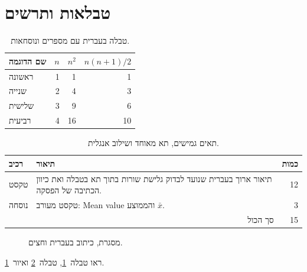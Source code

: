 \documentclass[11pt,a4paper]{article}
\begin{document}
\section{טבלאות ותרשים}\label{sec:tables}
\begin{table}[htbp]
\centering
\begin{tabular}{lrrr}
\toprule
שם הדוגמה & \(n\) & \(n^2\) & \(n(n+1)/2\)\\\midrule
ראשונה & 1 & 1 & 1\\
שנייה & 2 & 4 & 3\\
שלישית & 3 & 9 & 6\\
רביעית & 4 & 16 & 10\\\bottomrule
\end{tabular}
\caption{טבלה בעברית עם מספרים ונוסחאות.}\label{tab:numbers-hebrew}
\end{table}
\begin{table}[htbp]
\centering
\begin{tabularx}{\linewidth}{lXr}
\toprule רכיב & תיאור & כמות\\\midrule
טקסט & תיאור ארוך בעברית שנועד לבדוק גלישת שורות בתוך תא בטבלה ואת כיוון הכתיבה של הפסקה. & 12\\
נוסחה & טקסט מעורב: \textenglish{Mean value} והממוצע \(\bar{x}\). & 3\\
\multicolumn{2}{r}{סך הכול} & 15\\\bottomrule
\end{tabularx}
\caption{תאים גמישים, תא מאוחד ושילוב אנגלית.}\label{tab:wrap-hebrew}
\end{table}
\begin{figure}[htbp]
\centering
{}
\caption{מסגרת, כיתוב בעברית וחצים.}\label{fig:hebrew}
\end{figure}
ראו טבלה~\ref{tab:numbers-hebrew}, טבלה~\ref{tab:wrap-hebrew}
ואיור~\ref{fig:hebrew}.

\clearpage
\end{document}
